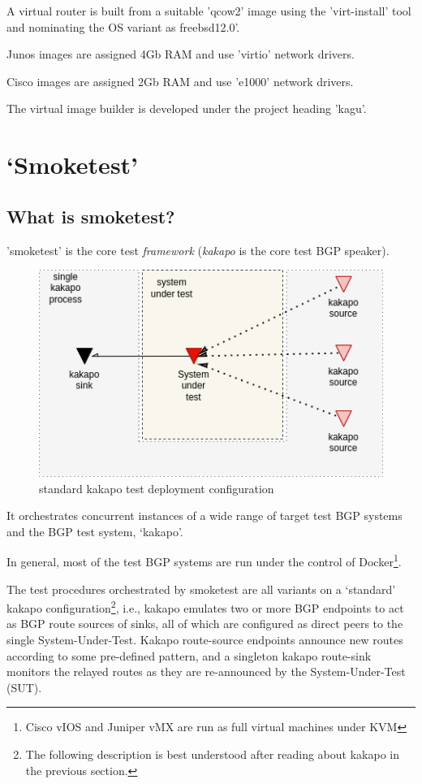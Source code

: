 A virtual router is built from a suitable 'qcow2' image using the 'virt-install' tool and nominating the OS variant as freebsd12.0'.

Junos images are assigned 4Gb RAM and use 'virtio' network drivers.

Cisco images are assigned 2Gb RAM and use 'e1000' network drivers.

The virtual image builder is developed under the project heading 'kagu'.


\NH{\rule{14cm}{0.4pt}}

\section{`Smoketest'}

\subsection*{What is smoketest?}
'smoketest' is the core test \textit{framework} (\textit{kakapo} is the core test BGP speaker).

\begin{figure}[H]
    \centering
    \includegraphics[width=0.7\linewidth]{images/bgp6.drawio.png}
    \caption{standard kakapo test deployment configuration}
    \label{fig:diag6}
\end{figure}

It orchestrates concurrent instances of a wide range of target test BGP systems and the BGP test system, `kakapo'.

In general, most of the test BGP systems are run under the control of Docker\footnote{Cisco vIOS and Juniper vMX are run as full virtual machines under KVM}.

The test procedures orchestrated by smoketest are all variants on a `standard' kakapo configuration\footnote{The following description is best understood after reading about kakapo in the previous section.}, i.e., kakapo emulates two or more BGP endpoints to act as BGP route sources of sinks, all of which are configured as direct peers to the single System-Under-Test.
Kakapo route-source endpoints announce new routes according to some pre-defined pattern, and a singleton kakapo route-sink monitors the relayed routes as they are re-announced by the System-Under-Test (SUT).


